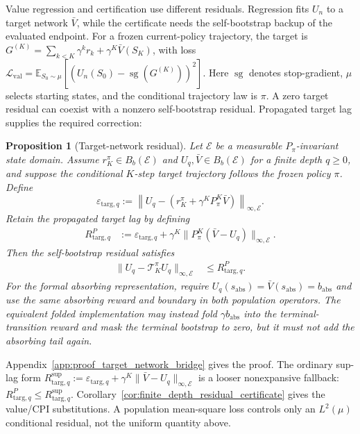 \documentclass{article}
\theoremstyle{plain}
\newtheorem{proposition}[theorem]{Proposition}
\theoremstyle{definition}
\theoremstyle{remark}
\newcommand{\E}{\mathbb{E}}
\newcommand{\sg}{\operatorname{sg}}
\begin{document}
Value regression and certification use different residuals. Regression fits
$U_n$ to a target network $\bar V$, while the certificate needs the
self-bootstrap backup of the evaluated endpoint. For a frozen current-policy
trajectory, the target is
$G^{(K)}=\sum_{k<K}\gamma^k r_k+\gamma^K\bar V(S_K)$, with loss
$\mathcal L_{\mathrm{val}}=\E_{S_0\sim\mu}[(U_n(S_0)-\sg(G^{(K)}))^2]$.
Here $\sg$ denotes stop-gradient, $\mu$ selects starting states, and the
conditional trajectory law is $\pi$.
A zero target residual can coexist with a nonzero self-bootstrap
residual. Propagated target lag supplies the required correction:

\begin{proposition}[Target-network residual]
\label{prop:target_network_bridge}
Let $\mathcal E$ be a measurable $P_\pi$-invariant state domain. Assume
$r_K^\pi\in B_b(\mathcal E)$ and
$U_q,\bar V\in B_b(\mathcal E)$ for a finite depth $q\ge0$, and suppose the conditional $K$-step target
trajectory follows the frozen policy $\pi$. Define
\begin{equation}
\varepsilon_{\mathrm{targ},q}
:=
\left\|U_q-
\left(r_K^\pi+\gamma^K P_\pi^K\bar V\right)
\right\|_{\infty,\mathcal E}.
\label{eq:target_population_residual}
\end{equation}
Retain the propagated target lag by defining
\begin{align}
R_{\mathrm{targ},q}^{P}
&:=\varepsilon_{\mathrm{targ},q}
+\gamma^K\|P_\pi^K(\bar V-U_q)\|_{\infty,\mathcal E}.
\label{eq:R_targ_propagated}
\end{align}
Then the self-bootstrap residual satisfies
\begin{align}
\|U_q-\mathcal T_K^\pi U_q\|_{\infty,\mathcal E}
&\le
R_{\mathrm{targ},q}^{P}.
\label{eq:target_network_residual_bridge}
\end{align}
For the formal absorbing representation, require
$U_q(s_{\mathrm{abs}})=\bar V(s_{\mathrm{abs}})=b_{\mathrm{abs}}$ and use the same
absorbing reward and boundary in both population operators. The equivalent
folded implementation may instead fold $\gamma b_{\mathrm{abs}}$ into the
terminal-transition reward and mask the terminal bootstrap to zero, but it
must not add the absorbing tail again.
\end{proposition}

Appendix~\ref{app:proof_target_network_bridge} gives the proof. The ordinary
sup-lag form
$R_{\mathrm{targ},q}^{\sup}:=\varepsilon_{\mathrm{targ},q}
+\gamma^K\|\bar V-U_q\|_{\infty,\mathcal E}$ is a looser nonexpansive
fallback: $R_{\mathrm{targ},q}^{P}\le R_{\mathrm{targ},q}^{\sup}$.
Corollary~\ref{cor:finite_depth_residual_certificate} gives the value/CPI
substitutions. A population mean-square loss controls only an $L^2(\mu)$
conditional residual, not the uniform quantity above.
\end{document}
